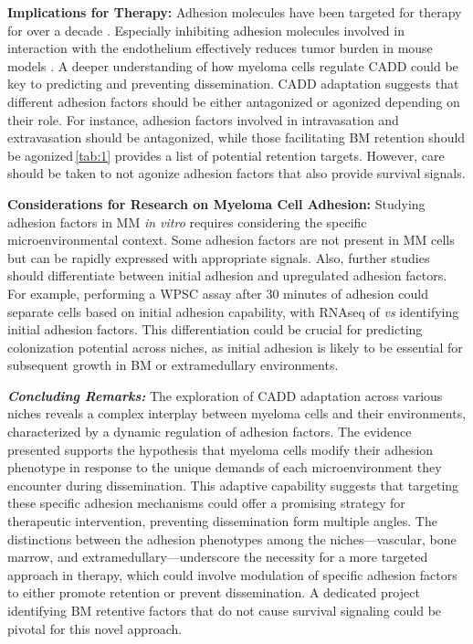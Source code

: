 \textbf{Implications for Therapy:}
Adhesion molecules have been targeted for therapy for over a decade
\cite{nairChapterSixEmerging2012, neriTargetingAdhesionMolecules2012}.
Especially inhibiting adhesion molecules involved in interaction with the
endothelium effectively reduces tumor burden in mouse models
\cite{asosinghUniquePathwayHoming2001a,
      mrozikTherapeuticTargetingNcadherin2015}. A deeper understanding of how myeloma
cells regulate \ac{CADD} could be key to predicting and preventing
dissemination. \ac{CADD} adaptation suggests that different adhesion factors
should be either antagonized or agonized depending on their role. For instance,
adhesion factors involved in intravasation and extravasation should be
antagonized, while those facilitating BM retention should be
agonized\,\textemdash\autoref{tab:1} provides a list of potential retention
targets. However, care should be taken to not agonize adhesion factors that also
provide survival signals.



\textbf{Considerations for Research on Myeloma Cell Adhesion:}
Studying adhesion factors in MM \textit{in vitro} requires considering the
specific microenvironmental context. Some adhesion factors are not present in MM
cells but can be rapidly expressed with appropriate signals. Also, further
studies should differentiate between initial adhesion and upregulated adhesion
factors. For example, performing a \ac{WPSC} assay after 30 minutes of adhesion
could separate  cells based on initial adhesion capability, with RNAseq of
\nMAina \textit{vs} \MAina identifying initial adhesion factors. This
differentiation could be crucial for predicting colonization potential across
niches, as initial adhesion is likely to be essential for subsequent growth in
\ac{BM} or extramedullary environments.



\textbf{\textit{Concluding Remarks:}} The exploration of \ac{CADD} adaptation
across various niches reveals a complex interplay between myeloma cells and
their environments, characterized by a dynamic regulation of adhesion factors.
The evidence presented supports the hypothesis that myeloma cells modify their
adhesion phenotype in response to the unique demands of each microenvironment
they encounter during dissemination. This adaptive capability suggests that
targeting these specific adhesion mechanisms could offer a promising strategy
for therapeutic intervention, preventing dissemination form multiple angles. The
distinctions between the adhesion phenotypes among the niches—vascular, bone
marrow, and extramedullary—underscore the necessity for a more targeted approach
in therapy, which could involve modulation of specific adhesion factors to
either promote retention or prevent dissemination. A dedicated project
identifying BM retentive factors that do not cause survival signaling could be
pivotal for this novel approach.

